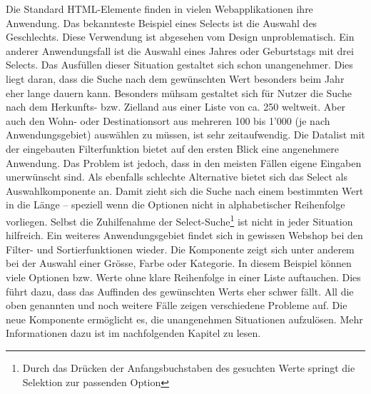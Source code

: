 Die Standard HTML-Elemente finden in vielen Webapplikationen ihre Anwendung.
Das bekannteste Beispiel eines Selects ist die Auswahl des Geschlechts.
Diese Verwendung ist abgesehen vom Design unproblematisch.
Ein anderer Anwendungsfall ist die Auswahl eines Jahres oder Geburtstags mit drei Selects.
Das Ausfüllen dieser Situation gestaltet sich schon unangenehmer.
Dies liegt daran, dass die Suche nach dem gewünschten Wert besonders beim Jahr eher lange dauern kann.
Besonders mühsam gestaltet sich für Nutzer die Suche nach dem Herkunfts- bzw. Zielland aus einer Liste von ca. 250 weltweit.
Aber auch den Wohn- oder Destinationsort aus mehreren 100 bis 1'000 (je nach Anwendungsgebiet) auswählen zu müssen, ist sehr zeitaufwendig.
Die Datalist mit der eingebauten Filterfunktion bietet auf den ersten Blick eine angenehmere Anwendung.
Das Problem ist jedoch, dass in den meisten Fällen eigene Eingaben unerwünscht sind.
Als ebenfalls schlechte Alternative bietet sich das Select als Auswahlkomponente an.
Damit zieht sich die Suche nach einem bestimmten Wert in die Länge – speziell wenn die Optionen nicht in alphabetischer Reihenfolge vorliegen.
Selbst die Zuhilfenahme der Select-Suche\footnote{
    Durch das Drücken der Anfangsbuchstaben des gesuchten Werte springt die Selektion zur passenden Option
} ist nicht in jeder Situation hilfreich. 
Ein weiteres Anwendungsgebiet findet sich in gewissen Webshop bei den Filter- und Sortierfunktionen wieder.
Die Komponente zeigt sich unter anderem bei der Auswahl einer Grösse, Farbe oder Kategorie.
In diesem Beispiel können viele Optionen bzw. Werte ohne klare Reihenfolge in einer Liste auftauchen.
Dies führt dazu, dass das Auffinden des gewünschten Werts eher schwer fällt.
All die oben genannten und noch weitere Fälle zeigen verschiedene Probleme auf.
Die neue Komponente ermöglicht es, die unangenehmen Situationen aufzulösen.
Mehr Informationen dazu ist im nachfolgenden Kapitel zu lesen.
